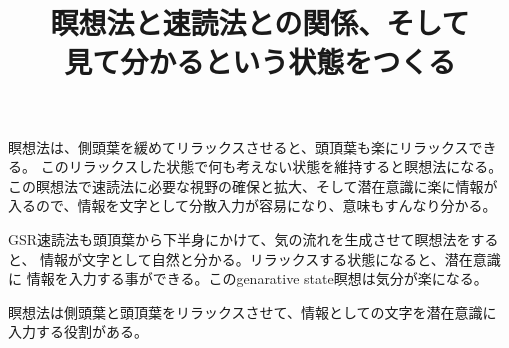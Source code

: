 \documentclass{jsarticle}
\begin{document}
\title{瞑想法と速読法との関係、そして \\
       見て分かるという状態をつくる}
\author{}
\date{}
\maketitle



    瞑想法は、側頭葉を緩めてリラックスさせると、頭頂葉も楽にリラックスできる。
  このリラックスした状態で何も考えない状態を維持すると瞑想法になる。
  この瞑想法で速読法に必要な視野の確保と拡大、そして潜在意識に楽に情報が
  入るので、情報を文字として分散入力が容易になり、意味もすんなり分かる。


    GSR速読法も頭頂葉から下半身にかけて、気の流れを生成させて瞑想法をすると、
  情報が文字として自然と分かる。リラックスする状態になると、潜在意識に
  情報を入力する事ができる。このgenarative state瞑想は気分が楽になる。


    瞑想法は側頭葉と頭頂葉をリラックスさせて、情報としての文字を潜在意識に
  入力する役割がある。
\end{document}
